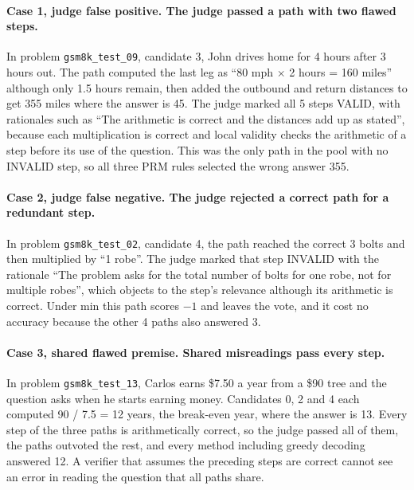 \documentclass{article}
\begin{document}
\paragraph{Case 1, judge false positive. The judge passed a path with two flawed steps.} In problem \texttt{gsm8k\_test\_09}, candidate 3, John drives home for 4 hours after 3 hours out. The path computed the last leg as ``80 mph $\times$ 2 hours = 160 miles'' although only 1.5 hours remain, then added the outbound and return distances to get 355 miles where the answer is 45. The judge marked all 5 steps VALID, with rationales such as ``The arithmetic is correct and the distances add up as stated'', because each multiplication is correct and local validity checks the arithmetic of a step before its use of the question. This was the only path in the pool with no INVALID step, so all three PRM rules selected the wrong answer 355.

\paragraph{Case 2, judge false negative. The judge rejected a correct path for a redundant step.} In problem \texttt{gsm8k\_test\_02}, candidate 4, the path reached the correct 3 bolts and then multiplied by ``1 robe''. The judge marked that step INVALID with the rationale ``The problem asks for the total number of bolts for one robe, not for multiple robes'', which objects to the step's relevance although its arithmetic is correct. Under min this path scores $-1$ and leaves the vote, and it cost no accuracy because the other 4 paths also answered 3.

\paragraph{Case 3, shared flawed premise. Shared misreadings pass every step.} In problem \texttt{gsm8k\_test\_13}, Carlos earns \$7.50 a year from a \$90 tree and the question asks when he starts earning money. Candidates 0, 2 and 4 each computed 90 / 7.5 = 12 years, the break-even year, where the answer is 13. Every step of the three paths is arithmetically correct, so the judge passed all of them, the paths outvoted the rest, and every method including greedy decoding answered 12. A verifier that assumes the preceding steps are correct cannot see an error in reading the question that all paths share.
\end{document}
